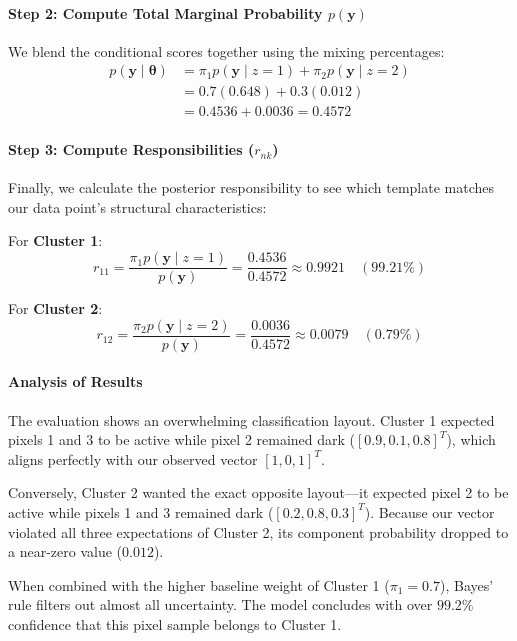 \documentclass{article}
\begin{document}
\paragraph{Step 2: Compute Total Marginal Probability $p(\mathbf{y})$}
We blend the conditional scores together using the mixing percentages:
\begin{align}
p(\mathbf{y} \mid \boldsymbol{\theta}) &= \pi_1 p(\mathbf{y} \mid z=1) + \pi_2 p(\mathbf{y} \mid z=2) \nonumber \\
&= 0.7(0.648) + 0.3(0.012) \nonumber \\
&= 0.4536 + 0.0036 = \mathbf{0.4572} \tag{128}
\end{align}

\paragraph{Step 3: Compute Responsibilities ($r_{nk}$)}
Finally, we calculate the posterior responsibility to see which template matches our data point's structural characteristics:

For \textbf{Cluster 1}:
\begin{equation}
r_{11} = \frac{\pi_1 p(\mathbf{y} \mid z=1)}{p(\mathbf{y})} = \frac{0.4536}{0.4572} \approx \mathbf{0.9921} \quad (99.21\%) \tag{129}
\end{equation}

For \textbf{Cluster 2}:
\begin{equation}
r_{12} = \frac{\pi_2 p(\mathbf{y} \mid z=2)}{p(\mathbf{y})} = \frac{0.0036}{0.4572} \approx \mathbf{0.0079} \quad (0.79\%) \tag{130}
\end{equation}

\paragraph{Analysis of Results}
The evaluation shows an overwhelming classification layout. Cluster 1 expected pixels 1 and 3 to be active while pixel 2 remained dark ($[0.9, 0.1, 0.8]^T$), which aligns perfectly with our observed vector $[1, 0, 1]^T$. 

Conversely, Cluster 2 wanted the exact opposite layout—it expected pixel 2 to be active while pixels 1 and 3 remained dark ($[0.2, 0.8, 0.3]^T$). Because our vector violated all three expectations of Cluster 2, its component probability dropped to a near-zero value ($0.012$). 

When combined with the higher baseline weight of Cluster 1 ($\pi_1 = 0.7$), Bayes' rule filters out almost all uncertainty. The model concludes with over $99.2\%$ confidence that this pixel sample belongs to Cluster 1.
\end{document}
